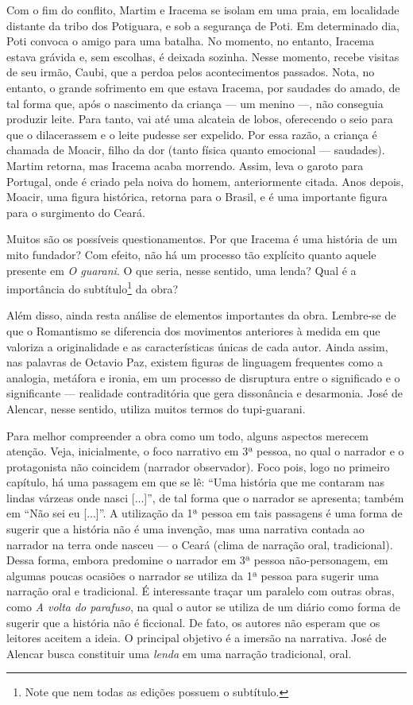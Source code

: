Com o fim do conflito, Martim e Iracema se isolam em uma praia, em localidade distante da tribo dos Potiguara, e sob a segurança de Poti. Em determinado dia, Poti convoca o amigo para uma batalha. No momento, no entanto, Iracema estava grávida e, sem escolhas, é deixada sozinha. Nesse momento, recebe visitas de seu irmão, Caubi, que a perdoa pelos acontecimentos passados. Nota, no entanto, o grande sofrimento em que estava Iracema, por saudades do amado, de tal forma que, após o nascimento da criança — um menino —, não conseguia produzir leite. Para tanto, vai até uma alcateia de lobos, oferecendo o seio para que o dilacerassem e o leite pudesse ser expelido. Por essa razão, a criança é chamada de Moacir, filho da dor (tanto física quanto emocional — saudades). Martim retorna, mas Iracema acaba morrendo. Assim, leva o garoto para Portugal, onde é criado pela noiva do homem, anteriormente citada. Anos depois, Moacir, uma figura histórica, retorna para o Brasil, e é uma importante figura para o surgimento do Ceará.

Muitos são os possíveis questionamentos. Por que Iracema é uma história de um mito fundador? Com efeito, não há um processo tão explícito quanto aquele presente em \textit{O guarani}. O que seria, nesse sentido, uma lenda? Qual é a importância do subtítulo\footnote{Note que nem todas as edições possuem o subtítulo.} da obra?

Além disso, ainda resta análise de elementos importantes da obra. Lembre-se de que o Romantismo se diferencia dos movimentos anteriores à medida em que valoriza a originalidade e as características únicas de cada autor. Ainda assim, nas palavras de Octavio Paz, existem figuras de linguagem frequentes como a analogia, metáfora e ironia, em um processo de disruptura entre o significado e o significante — realidade contraditória que gera dissonância e desarmonia. José de Alencar, nesse sentido, utiliza muitos termos do tupi-guarani.

Para melhor compreender a obra como um todo, alguns aspectos merecem atenção. Veja, inicialmente, o foco narrativo em 3ª pessoa, no qual o narrador e o protagonista não coincidem (narrador observador). Foco pois, logo no primeiro capítulo, há uma passagem em que se lê: ``Uma história que me contaram nas lindas várzeas onde nasci [...]'', de tal forma que o narrador se apresenta; também em ``Não sei eu [...]''. A utilização da 1ª pessoa em tais passagens é uma forma de sugerir que a história não é uma invenção, mas uma narrativa contada ao narrador na terra onde nasceu — o Ceará (clima de narração oral, tradicional). Dessa forma, embora predomine o narrador em 3ª pessoa não-personagem, em algumas poucas ocasiões o narrador se utiliza da 1ª pessoa para sugerir uma narração oral e tradicional. É interessante traçar um paralelo com outras obras, como \textit{A volta do parafuso}, na qual o autor se utiliza de um diário como forma de sugerir que a história não é ficcional. De fato, os autores não esperam que os leitores aceitem a ideia. O principal objetivo é a imersão na narrativa. José de Alencar busca constituir uma \textit{lenda} em uma narração tradicional, oral.

